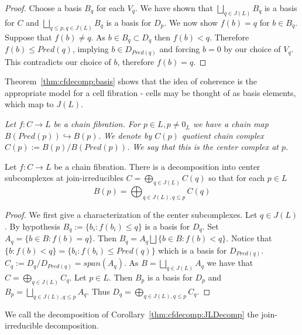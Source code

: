 \begin{proof}
Choose a basis $B_q$ for each $V_q$.  We have shown that $\bigsqcup_{q\in J(L)} B_q$ is a basis for $C$ and $\bigsqcup_{q\leq p, q\in J(L)} B_q$ is a basis for $D_p$.   We now show $f(b)=q$ for $b\in B_q$. Suppose that $f(b)\neq q$.  As $b\in B_q\subset D_q$ then $f(b)< q$.  Therefore $f(b)\leq Pred(q)$, implying $b\in D_{Pred(q)}$ and forcing $b=0$ by our choice of $V_q$.  This contradicts our choice of $b$, therefore $f(b)=q$. 

\end{proof}





Theorem~\ref{thm:cfdecomp:basis} shows that the idea of coherence is the appropriate model for a cell fibration - cells may be thought of as basis elements, which map to $J(L)$.  
 
\begin{defn}
{\em
Let $f:C\to L$ be a chain fibration. For $p\in L, p\neq 0_L$ we have a chain map $B(Pred(p))\hookrightarrow B(p)$.   We denote by $C(p)$ quotient chain complex $C(p):= B(p)/B(Pred(p))$.  We say that this is the {\em center complex at $p$}.
}
\end{defn}
 
 
 
 \begin{cor}\label{thm:cfdecomp:JLDecomp}
 Let $f:C\to L$ be a chain fibration.  There is a decomposition into center subcomplexes at join-irreducibles $C= \bigoplus_{q\in J(L)} C(q)$ so that for each $p\in L$ $$B(p)= \bigoplus_{q\in J(L), q\leq p} C(q)$$ 
 \end{cor}
 \begin{proof}
  We first give a characterization of the center subcomplexes.  Let $q\in J(L)$.  By hypothesis $B_q:= \{b_i: f(b_i)\leq q\}$ is a basis for $D_q$.  Set $A_q =  \{b\in B:f(b)=q\}$.  Then $B_q = A_q\bigsqcup \{b\in B:f(b)< q\}$.  Notice that $\{b:f(b)<q\} = \{b_i:f(b_i)\leq Pred(q)\}$ which is a basis for $D_{Pred(q)}$.    $C_q := D_q/ D_{Pred(q)} = span(A_q)$.  As $B = \bigsqcup_{q\in J(L)} A_q$ we have that $C=\bigoplus_{q\in J(L)} C_q$.  Let $p\in L$.  Then $B_p$ is a basis for $D_p$ and $B_p = \bigsqcup_{q\in J(L),q\leq p} A_q$.  Thus $D_q = \bigoplus_{q\in J(L),q\leq p} C_q$.



 \end{proof}

 
 
 We call the decomposition of Corollary~\ref{thm:cfdecomp:JLDecomp} the join-irreducible decomposition.   
 
